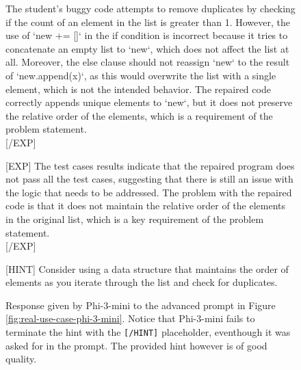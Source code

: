 \documentclass{article}
\begin{document}
\begin{figure*}[h!]
    \centering
    \begin{tcolorbox}[colframe=black!10!white, colback=black!5!white]
        \begin{minipage}{\textwidth}
            \ttfamily
            [EXP]
            The student's buggy code attempts to remove duplicates by checking if the count of an element in the list is greater than 1. However, the use of `new += []` in the if condition is incorrect because it tries to concatenate an empty list to `new`, which does not affect the list at all. Moreover, the else clause should not reassign `new` to the result of `new.append(x)`, as this would overwrite the list with a single element, which is not the intended behavior. The repaired code correctly appends unique elements to `new`, but it does not preserve the relative order of the elements, which is a requirement of the problem statement.\texttt{\\}
            [/EXP]
            \texttt{\\}
            
            [EXP]
            The test cases results indicate that the repaired program does not pass all the test cases, suggesting that there is still an issue with the logic that needs to be addressed. The problem with the repaired code is that it does not maintain the relative order of the elements in the original list, which is a key requirement of the problem statement.\texttt{\\}
            [/EXP]
            \texttt{\\}
            
            [HINT]
            Consider using a data structure that maintains the order of elements as you iterate through the list and check for duplicates.
        \end{minipage}
    \end{tcolorbox}
    \caption{Response given by Phi-3-mini to the advanced prompt in Figure \ref{fig:real-use-case-phi-3-mini}. Notice that Phi-3-mini fails to terminate the hint with the \texttt{[/HINT]} placeholder, eventhough it was asked for in the prompt. The provided hint however is of good quality.}
    \label{fig:real-use-case-phi-3-mini-response}
\end{figure*}

\end{document}
